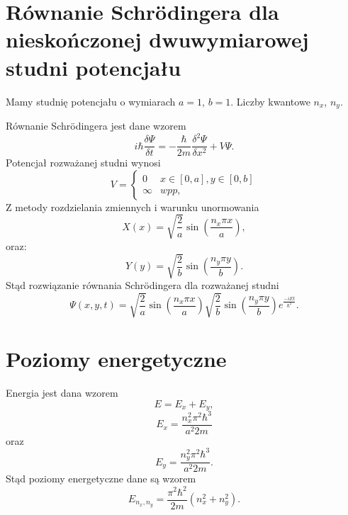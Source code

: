 \documentclass[11pt,a4paper,oneside]{article}
\begin{document}
\section{Równanie Schrödingera dla nieskończonej dwuwymiarowej studni potencjału}
	Mamy studnię potencjału o wymiarach $a=1$, $b=1$. Liczby kwantowe $n_{x}$, $n_{y}$.
	\newline
	
	\noindent Równanie Schrödingera jest dane wzorem
	\begin{equation}
		i\hbar \frac{\delta \Psi}{\delta t} = -\frac{\hbar}{2m}\frac{\delta ^{2} \Psi}{\delta x ^{2}}+V \Psi.
	\end{equation}
	Potencjał rozważanej studni wynosi
	\begin{equation}
			V =
			\begin{cases}
				0 & x\in [0, a], y\in [0, b]\\
				\infty & wpp,
			\end{cases} 
	\end{equation}
	Z metody rozdzielania zmiennych i warunku unormowania
	\begin{equation}
		X(x) = \sqrt{\frac{2}{a}}\sin \left(\frac{n_{x}\pi x}{a}\right ),
	\end{equation}
	oraz:
	\begin{equation}
		Y(y) = \sqrt{\frac{2}{b}}\sin \left(\frac{n_{y}\pi y}{b}\right ).
	\end{equation}
	Stąd rozwiązanie równania Schrödingera dla rozważanej studni
	\begin{equation}
		\Psi (x, y, t) = \sqrt{\frac{2}{a}}\sin \left(\frac{n_{x}\pi x}{a}\right )\sqrt{\frac{2}{b}}\sin \left(\frac{n_{y}\pi y}{b}\right )e^{\frac{-iEt}{\hbar ^{2}}}.
	\end{equation}
\section{Poziomy energetyczne}
	Energia jest dana wzorem
	\begin{equation}
		E = E_{x}+E_{y},
	\end{equation}
	\begin{equation}
		E_{x} = \frac{n_{x} ^{2} \pi ^{2} \hbar ^{3}}{a^{2} 2 m}
	\end{equation}
	oraz
	\begin{equation}
		E_{y} = \frac{n_{y} ^{2} \pi ^{2} \hbar ^{3}}{a^{2} 2 m}.
	\end{equation}
	Stąd poziomy energetyczne dane są wzorem
	\begin{equation}
		E_{n_{x}, n_{y}} = \frac{\pi ^{2} \hbar ^{2}}{2m} (n_{x}^2+n_{y}^{2}).
	\end{equation}
\end{document}
